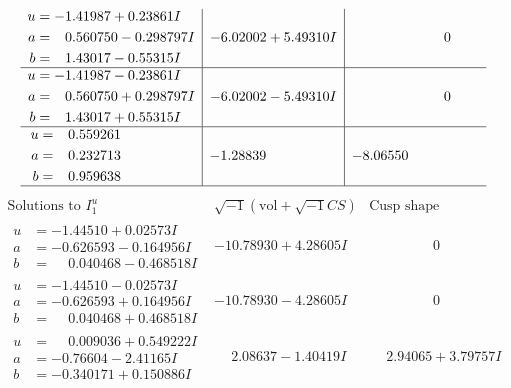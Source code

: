 \documentclass[1p]{elsarticle_modified}
\theoremstyle{definition}
\newcommand{\I}{\sqrt{-1}}
\begin{document}
$$\begin{array}{c|c|c}
\begin{aligned}
u &= -1.41987 + 0.23861 I \\
a &= \phantom{-}0.560750 - 0.298797 I \\
b &= \phantom{-}1.43017 - 0.55315 I\end{aligned}
 & -6.02002 + 5.49310 I & \phantom{-0.000000 } 0 \\ \hline\begin{aligned}
u &= -1.41987 - 0.23861 I \\
a &= \phantom{-}0.560750 + 0.298797 I \\
b &= \phantom{-}1.43017 + 0.55315 I\end{aligned}
 & -6.02002 - 5.49310 I & \phantom{-0.000000 } 0 \\ \hline\begin{aligned}
u &= \phantom{-}0.559261\phantom{ +0.000000I} \\
a &= \phantom{-}0.232713\phantom{ +0.000000I} \\
b &= \phantom{-}0.959638\phantom{ +0.000000I}\end{aligned}
 & -1.28839\phantom{ +0.000000I} & -8.06550\phantom{ +0.000000I}\\
 \hline 
 \end{array}$$\newpage$$\begin{array}{c|c|c}  
\text{Solutions to }I^u_{1}& \I (\text{vol} + \sqrt{-1}CS) & \text{Cusp shape}\\
 \hline 
\begin{aligned}
u &= -1.44510 + 0.02573 I \\
a &= -0.626593 - 0.164956 I \\
b &= \phantom{-}0.040468 - 0.468518 I\end{aligned}
 & -10.78930 + 4.28605 I & \phantom{-0.000000 } 0 \\ \hline\begin{aligned}
u &= -1.44510 - 0.02573 I \\
a &= -0.626593 + 0.164956 I \\
b &= \phantom{-}0.040468 + 0.468518 I\end{aligned}
 & -10.78930 - 4.28605 I & \phantom{-0.000000 } 0 \\ \hline\begin{aligned}
u &= \phantom{-}0.009036 + 0.549222 I \\
a &= -0.76604 - 2.41165 I \\
b &= -0.340171 + 0.150886 I\end{aligned}
 & \phantom{-}2.08637 - 1.40419 I & \phantom{-}2.94065 + 3.79757 I \\ \hline\begin{aligned}

\end{aligned}
\end{array}$$
\end{document}
